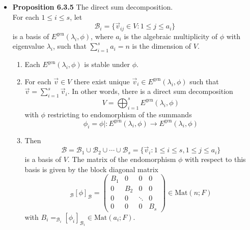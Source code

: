 \documentclass[11pt,a4paper]{article}
\begin{document}
\begin{itemize}
    \item \textbf{Proposition 6.3.5} The direct sum decomposition. \\
        For each $1 \leq i \leq s$, let
        \[
            \mathcal{B}_i = \{ \vec{v}_{ij} \in V : 1 \leq j \leq a_i \}
        \]
        is a basis of $E^{\mathrm{gen}} (\lambda_i, \phi)$,
        where $a_i$ is the algebraic multiplicity of $\phi$ with eigenvalue $\lambda_i$,
        such that $\sum_{i=1}^s a_i = n$ is the dimension of $V$.
        \begin{enumerate}
            \item Each $E^{\mathrm{gen}} (\lambda_i, \phi)$ is stable under $\phi$.
            \item For each $\vec{v} \in V$ there exist unique
                $\vec{v}_i \in E^{\mathrm{gen}} (\lambda_i, \phi)$
                such that $\vec{v} = \sum_{i=1}^s \vec{v}_i$.
                In other words, there is a direct sum decomposition
                \[
                    V = \bigoplus_{i=1}^s E^{\mathrm{gen}} (\lambda_i, \phi)
                \]
                with $\phi$ restricting to endomorphism of the summands
                \[
                    \phi_i = \phi | : E^{\mathrm{gen}} (\lambda_i, \phi)
                    \to E^{\mathrm{gen}} (\lambda_i, \phi)
                \]
            \item Then
                \[
                    \mathcal{B} = \mathcal{B}_1 \cup \mathcal{B}_2 \cup \cdots \cup
                    \mathcal{B}_s = \{ \vec{v}_i : 1 \leq i \leq s, 1 \leq j \leq a_i \}
                \]
                is a basis of $V$.
                The matrix of the endomorphism $\phi$ with respect to this basis is given
                by the block diagonal matrix
                \[
                    _\mathcal{B} {[\phi]}_\mathcal{B} =
                    \begin{pmatrix}
                        B_1 & 0   & 0      & 0 \\
                        0   & B_2 & 0      & 0  \\
                        0   & 0   & \ddots & 0 \\
                        0   & 0   & 0      & B_s
                    \end{pmatrix}
                    \in \mathrm{Mat}(n; F)
                \]
                with $B_i = _{\mathcal{B}_i}
                {[\phi_i]}_{\mathcal{B}_i} \in \mathrm{Mat}(a_i; F)$.
        \end{enumerate}


\end{itemize}
\end{document}
